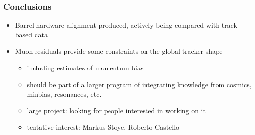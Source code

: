 \documentclass[compress]{beamer}
\begin{document}

\begin{frame}
\frametitle{Conclusions}
\begin{itemize}\setlength{\itemsep}{0.5 cm}
\item Barrel hardware alignment produced, actively being compared with track-based data

\item Muon residuals provide some constraints on the global tracker shape

\vspace{-0.25 cm}
\begin{itemize}\setlength{\itemsep}{0.1 cm}
\item including estimates of momentum bias
\item should be part of a larger program of integrating knowledge from cosmics, minbias, resonances, etc.
\item large project: looking for people interested in working on it
\item tentative interest: Markus Stoye, Roberto Castello
\end{itemize}
\end{itemize}
\label{numpages}
\end{frame}
\end{document}
